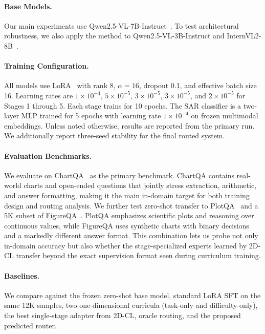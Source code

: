 \documentclass[journal]{IEEEtran}
\newcommand{\method}{2D-CL}
\newcommand{\sar}{SAR}
\begin{document}
\paragraph{Base Models.}
Our main experiments use Qwen2.5-VL-7B-Instruct~\cite{bai2023qwen}.
To test architectural robustness, we also apply the method to Qwen2.5-VL-3B-Instruct and InternVL2-8B~\cite{chen2024internvl}.

\paragraph{Training Configuration.}
All models use LoRA~\cite{hu2022lora} with rank 8, $\alpha=16$, dropout 0.1, and effective batch size 16.
Learning rates are $1\times10^{-4}$, $5\times10^{-5}$, $3\times10^{-5}$, $3\times10^{-5}$, and $2\times10^{-5}$ for Stages 1 through 5.
Each stage trains for 10 epochs.
The \sar{} classifier is a two-layer MLP trained for 5 epochs with learning rate $1\times10^{-4}$ on frozen multimodal embeddings.
Unless noted otherwise, results are reported from the primary run. We additionally report three-seed stability for the final routed system.

\paragraph{Evaluation Benchmarks.}
We evaluate on ChartQA~\cite{masry2022chartqa} as the primary benchmark.
ChartQA contains real-world charts and open-ended questions that jointly stress extraction, arithmetic, and answer formatting, making it the main in-domain target for both training design and routing analysis.
We further test zero-shot transfer to PlotQA~\cite{methani2020plotqa} and a 5K subset of FigureQA~\cite{kahou2017figureqa}.
PlotQA emphasizes scientific plots and reasoning over continuous values, while FigureQA uses synthetic charts with binary decisions and a markedly different answer format.
This combination lets us probe not only in-domain accuracy but also whether the stage-specialized experts learned by \method{} transfer beyond the exact supervision format seen during curriculum training.

\paragraph{Baselines.}
We compare against the frozen zero-shot base model, standard LoRA SFT on the same 12K samples, two one-dimensional curricula (task-only and difficulty-only), the best single-stage adapter from \method{}, oracle routing, and the proposed predicted router.
\end{document}
